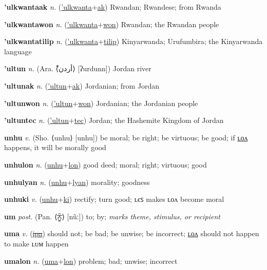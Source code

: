 \textbf{\hypertarget{'ulkwantaak}{'ulkwantaak}} \textit{n.} (\hyperlink{'ulkwanta}{'ulkwanta}+\allowbreak \hyperlink{ak}{ak})
Rwandan; Rwandese; from Rwanda

\textbf{\hypertarget{'ulkwantawon}{'ulkwantawon}} \textit{n.} (\hyperlink{'ulkwanta}{'ulkwanta}+\allowbreak \hyperlink{won}{won})
Rwandan; the Rwandan people

\textbf{\hypertarget{'ulkwantatilip}{'ulkwantatilip}} \textit{n.} (\hyperlink{'ulkwanta}{'ulkwanta}+\allowbreak \hyperlink{tilip}{tilip})
Kinyarwanda; Urufumbira; the Kinyarwanda language

\textbf{\hypertarget{'ultun}{'ultun}} \textit{n.} (Ara. ⟨{\arabics{}ْأردن}⟩ [ʔurdunn])
Jordan river

\textbf{\hypertarget{'ultunak}{'ultunak}} \textit{n.} (\hyperlink{'ultun}{'ultun}+\allowbreak \hyperlink{ak}{ak})
Jordanian; from Jordan

\textbf{\hypertarget{'ultunwon}{'ultunwon}} \textit{n.} (\hyperlink{'ultun}{'ultun}+\allowbreak \hyperlink{won}{won})
Jordanian; the Jordanian people

\textbf{\hypertarget{'ultuntec}{'ultuntec}} \textit{n.} (\hyperlink{'ultun}{'ultun}+\allowbreak \hyperlink{tec}{tec})
Jordan; the Hashemite Kingdom of Jordan

\textbf{\hypertarget{unhu}{unhu}} \textit{v.} (Sho. ⟨unhu⟩ [unhu])
be moral; be right; be virtuous; be good; if \hyperlink{unhulon}{ʟᴏᴧ} happens, it will be morally good

\textbf{\hypertarget{unhulon}{unhulon}} \textit{n.} (\hyperlink{unhu}{unhu}+\allowbreak \hyperlink{lon}{lon})
good deed; moral; right; virtuous; good

\textbf{\hypertarget{unhulyan}{unhulyan}} \textit{n.} (\hyperlink{unhu}{unhu}+\allowbreak \hyperlink{lyan}{lyan})
morality; goodness

\textbf{\hypertarget{unhuki}{unhuki}} \textit{v.} (\hyperlink{unhu}{unhu}+\allowbreak \hyperlink{ki}{ki})
rectify; turn good; ʟєꜱ makes ʟᴏᴧ become moral

\textbf{\hypertarget{um}{um}} \textit{post.} (Pan. ⟨{\gurmukhi{}ਨੂੰ}⟩ [nũː])
to; by; \textit{marks theme, stimulus, or recipient}

\textbf{\hypertarget{uma}{uma}} \textit{v.} (\hyperlink{ipa}{\sout{ipa}})
should not; be bad; be unwise; be incorrect; \hyperlink{umalon}{ʟᴏᴧ} should not happen to make ʟᴜᴍ happen

\textbf{\hypertarget{umalon}{umalon}} \textit{n.} (\hyperlink{uma}{uma}+\allowbreak \hyperlink{lon}{lon})
problem; bad; unwise; incorrect

